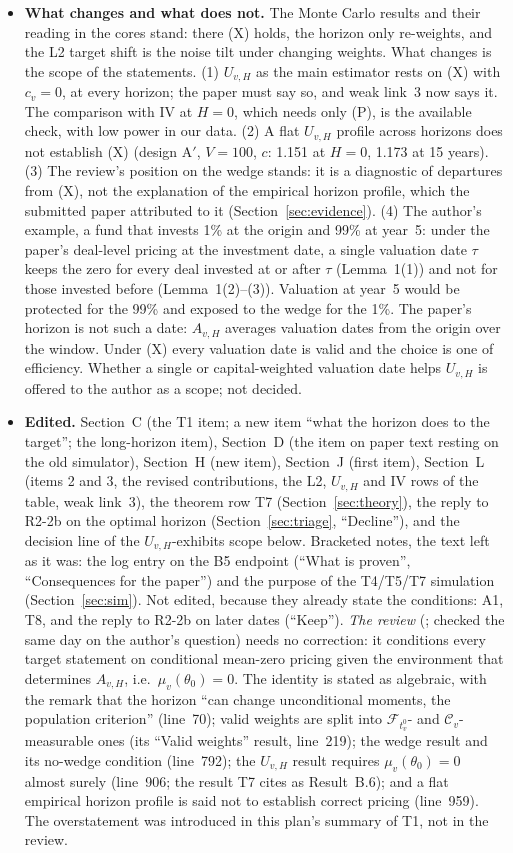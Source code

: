 \documentclass[11pt]{article}
\newcommand{\file}[1]{\path{#1}}
\newcommand{\C}{\mathcal{C}}
\newcommand{\F}{\mathcal{F}}
\begin{document}
\begin{itemize}
\item \textbf{What changes and what does not.} The Monte Carlo results and their reading in the cores stand: there (X) holds, the horizon only re-weights, and the L2 target shift is the noise tilt under changing weights. What changes is the scope of the statements. (1) $U_{v,H}$ as the main estimator rests on (X) with $c_v=0$, at every horizon; the paper must say so, and weak link~3 now says it. The comparison with IV at $H=0$, which needs only (P), is the available check, with low power in our data. (2) A flat $U_{v,H}$ profile across horizons does not establish (X) (design A$'$, $V=100$, $c$: 1.151 at $H=0$, 1.173 at 15 years). (3) The review's position on the wedge stands: it is a diagnostic of departures from (X), not the explanation of the empirical horizon profile, which the submitted paper attributed to it (Section~\ref{sec:evidence}). (4) The author's example, a fund that invests 1\% at the origin and 99\% at year~5: under the paper's deal-level pricing at the investment date, a single valuation date $\tau$ keeps the zero for every deal invested at or after $\tau$ (Lemma~1(1)) and not for those invested before (Lemma~1(2)--(3)). Valuation at year~5 would be protected for the 99\% and exposed to the wedge for the 1\%. The paper's horizon is not such a date: $A_{v,H}$ averages valuation dates from the origin over the window. Under (X) every valuation date is valid and the choice is one of efficiency. Whether a single or capital-weighted valuation date helps $U_{v,H}$ is offered to the author as a scope; not decided.
\item \textbf{Edited.} Section~C (the T1 item; a new item ``what the horizon does to the target''; the long-horizon item), Section~D (the item on paper text resting on the old simulator), Section~H (new item), Section~J (first item), Section~L (items 2 and 3, the revised contributions, the L2, $U_{v,H}$ and IV rows of the table, weak link~3), the theorem row T7 (Section~\ref{sec:theory}), the reply to R2-2b on the optimal horizon (Section~\ref{sec:triage}, ``Decline''), and the decision line of the $U_{v,H}$-exhibits scope below. Bracketed notes, the text left as it was: the log entry on the B5 endpoint (``What is proven'', ``Consequences for the paper'') and the purpose of the T4/T5/T7 simulation (Section~\ref{sec:sim}). Not edited, because they already state the conditions: A1, T8, and the reply to R2-2b on later dates (``Keep''). \emph{The review} (\file{review_of_referee_reports.tex}; checked the same day on the author's question) needs no correction: it conditions every target statement on conditional mean-zero pricing given the environment that determines $A_{v,H}$, i.e.\ $\mu_v(\theta_0)=0$. The identity is stated as algebraic, with the remark that the horizon ``can change unconditional moments, the population criterion'' (line~70); valid weights are split into $\F_{t_v^0}$- and $\C_v$-measurable ones (its ``Valid weights'' result, line~219); the wedge result and its no-wedge condition (line~792); the $U_{v,H}$ result requires $\mu_v(\theta_0)=0$ almost surely (line~906; the result T7 cites as Result~B.6); and a flat empirical horizon profile is said not to establish correct pricing (line~959). The overstatement was introduced in this plan's summary of T1, not in the review.

\end{itemize}
\end{document}
